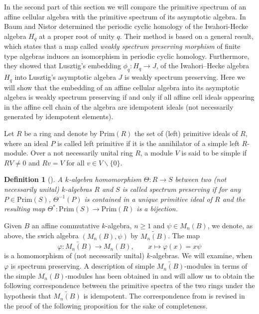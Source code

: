\documentclass[oneside, a4paper, 11pt]{amsart}
\newtheorem{definition}[theorem]{Definition }
\newcommand{\Prim}{\mathrm{Prim}}
\begin{document}
In the second part of this section we will compare the primitive spectrum of an affine cellular algebra with the primitive spectrum of its asymptotic algebra.
In \cite{BN} Baum and Nistor determined the periodic cyclic homology of the Iwahori-Hecke algebra $H_q$ at a proper root of unity $q$.  Their method is based on a general result, which states that a map called \emph{weakly spectrum preserving morphism} of finite type algebras induces an isomorphism in periodic cyclic homology. Furthermore, they showed that Lusztig's embedding $\phi_q: H_q \to J$, of the Iwahori–Hecke algebra $H_q$ into Lusztig's asymptotic algebra $J$ is weakly spectrum preserving. Here we will show that the embedding of an affine cellular algebra into its asymptotic algebra is weakly spectrum preserving if and only if all affine cell ideals appearing in the affine cell chain of the algebra are idempotent ideals (not necessarily generated by idempotent elements).

Let $R$ be a ring and denote by $\Prim(R)$ the set of (left) primitive ideals of $R$, where an ideal $P$ is called left primitive if it is the annihilator of a simple left $R$-module. Over a not necessarily unital ring $R$, a module $V$ is said to be simple if $R V\neq 0$ and $R v=V$ for all  $v\in V\backslash\{0\}$.


\begin{definition}[\cite{BN}]
  A $k$-algebra homomorphism  $\Theta:R\to S$ between two (not necessarily unital) $k$-algebras $R$ and $S$ is called \emph{spectrum preserving} if for any
  $P\in \Prim(S)$, $\Theta^{-1}(P)$ is contained in a unique primitive ideal of $R$ and the resulting map $\Theta^*: \Prim(S)\to \Prim(R)$ is a bijection.
\end{definition}

Given $B$ an affine commutative $k$-algebra, $n\geq 1$ and $\psi\in M_n(B)$, we denote, as above, the swich algebra $(M_n(B),\psi)$ by $\widetilde{M_n(B)}$. The map
$$ \varphi: \widetilde{M_n(B)} \to M_n(B), \qquad x\mapsto \varphi(x)=x\psi$$ is a  homomorphism of (not necessarily unital) $k$-algebras. We will examine, when $\varphi$ is spectrum preserving. A description of simple $\widetilde{M_n(B)}$-modules in terms of the simple $M_n(B)$-modules has been obtained in \cite[Theorem 3.10]{KXaffine} and will allow us to obtain the following correspondence between the primitive spectra of the two rings under the hypothesis that $\widetilde{M_n(B)}$ is idempotent. The correspondence from \cite{KXaffine} is revised in the proof of the following proposition for the sake of completeness.
\end{document}
